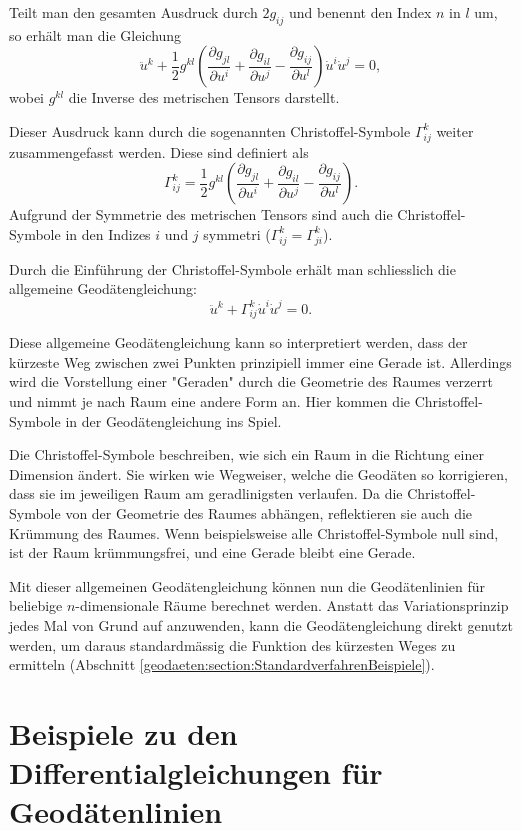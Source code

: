 Teilt man den gesamten Ausdruck durch $2g_{ij}$ und benennt den Index $n$ in $l$ um, so erhält man die Gleichung
\begin{equation}
	\ddot{u}^k + \frac{1}{2} g^{kl} \left( \frac{\partial g_{jl}}{\partial u^i} + \frac{\partial g_{il}}{\partial u^j} - \frac{\partial g_{ij}}{\partial u^l} \right) \dot{u}^i \dot{u}^j = 0,
\end{equation}
wobei $g^{kl}$ die Inverse des metrischen Tensors darstellt.

Dieser Ausdruck kann durch die sogenannten Christoffel-Symbole $\Gamma^k_{ij}$ weiter zusammengefasst werden.
Diese sind definiert als
\begin{equation}
	\Gamma^k_{ij} = \frac{1}{2} g^{kl} \left( \frac{\partial g_{jl}}{\partial u^i} + \frac{\partial g_{il}}{\partial u^j} - \frac{\partial g_{ij}}{\partial u^l} \right).
\end{equation}
Aufgrund der Symmetrie des metrischen Tensors sind auch die Christoffel-Symbole in den Indizes $i$ und $j$ symmetri ($\Gamma^k_{ij} = \Gamma^k_{ji}$).

Durch die Einführung der Christoffel-Symbole erhält man schliesslich die allgemeine Geodätengleichung:
\begin{equation}
	\ddot{u}^k + \Gamma^k_{ij} \dot{u}^i \dot{u}^j = 0.
\end{equation}

Diese allgemeine Geodätengleichung kann so interpretiert werden, dass der kürzeste Weg zwischen zwei Punkten prinzipiell immer eine Gerade ist. 
Allerdings wird die Vorstellung einer "Geraden" durch die Geometrie des Raumes verzerrt und nimmt je nach Raum eine andere Form an. 
Hier kommen die Christoffel-Symbole in der Geodätengleichung ins Spiel.

Die Christoffel-Symbole beschreiben, wie sich ein Raum in die Richtung einer Dimension ändert.
Sie wirken wie Wegweiser, welche die Geodäten so korrigieren, dass sie im jeweiligen Raum am geradlinigsten verlaufen. 
Da die Christoffel-Symbole von der Geometrie des Raumes abhängen, reflektieren sie auch die Krümmung des Raumes.
Wenn beispielsweise alle Christoffel-Symbole null sind, ist der Raum krümmungsfrei, und eine Gerade bleibt eine Gerade.

Mit dieser allgemeinen Geodätengleichung können nun die Geodätenlinien für beliebige $n$-dimensionale Räume berechnet werden. 
Anstatt das Variationsprinzip jedes Mal von Grund auf anzuwenden, kann die Geodätengleichung direkt genutzt werden, um daraus standardmässig die Funktion des kürzesten Weges zu ermitteln (Abschnitt \ref{geodaeten:section:StandardverfahrenBeispiele}).

\section{Beispiele zu den Differentialgleichungen für Geodätenlinien 
\label{geodaeten:section:StandardverfahrenBeispiele}}





